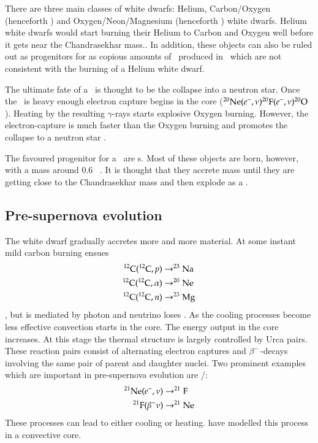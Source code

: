 There are three main classes of white dwarfs: Helium, Carbon/Oxygen (henceforth \cowd) and Oxygen/Neon/Magnesium (henceforth \onemgwd) white dwarfs. Helium white dwarfs would start burning their Helium to Carbon and Oxygen well before it gets near the Chandrasekhar mass.. In addition, these objects can also be ruled out as progenitors for \sneia as copious amounts of \ige\ produced in \sneia\, which are not consistent with the burning of a Helium white dwarf. 

The ultimate fate of a \onemgwd\ is thought to be the collapse into a neutron star. Once the \onemgwd\ is heavy enough electron capture begins in the core ($\Ne(e^-,\nu)\F[20](e^-,\nu)\Ox[20]$). Heating by the resulting $\gamma$-rays starts explosive Oxygen burning. However, the electron-capture is much faster than the Oxygen burning and promotes the collapse to a neutron star \citep{1991ApJ...367L..19N, 2005A&A...435..231G}. 

The favoured progenitor for a \snia\  are \cowd s. Most of these objects are born, however, with a mass around 0.6 \msun\ \citep{2007MNRAS.375.1315K}. It is thought that they accrete mass until they are getting close to the Chandrasekhar mass and then explode as a \snia.

\subsection{Pre-supernova evolution}
The white dwarf gradually accretes more and more material. At some instant mild carbon burning ensues
\begin{align}
\nonumber
\Carb(\Carb,p) &\rightarrow \Na \\  \nonumber
\Carb(\Carb,\alpha) &\rightarrow \Ne \\ 
\Carb(\Carb,n) &\rightarrow \Mg[23]
\end{align},
but is mediated by photon and neutrino loses \citep{2005NuPhA.758..463L, 2007nps..book.....I}. As the cooling processes become less effective convection starts in the core. The energy output in the core increases. At this stage the thermal structure is largely controlled by Urca pairs. These reaction pairs consist of alternating electron captures and $\beta^-$\,-decays involving the same pair of parent and daughter nuclei. Two prominent examples which are important in pre-supernova evolution are \Ne[21]/\F[21]:
\begin{align}
\nonumber
\Ne[21](e^-, \nu) &\rightarrow \F[21] \\
\F[21](\beta^- \nu) &\rightarrow \Ne[21]
\end{align}
These processes can lead to either cooling or heating. \cite{2005NuPhA.758..463L} have modelled this process in a convective core. 


